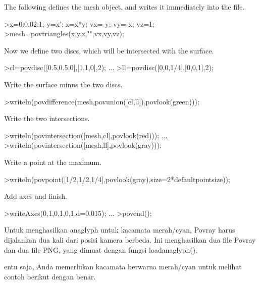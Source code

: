 \documentclass[a4paper,10pt]{article}
\begin{document}
\begin{eulernotebook}
\begin{eulercomment}
The following defines the mesh object, and writes it immediately into the file.
\end{eulercomment}
\begin{eulerprompt}
>x=0:0.02:1; y=x'; z=x*y; vx=-y; vy=-x; vz=1;
>mesh=povtriangles(x,y,z,"",vx,vy,vz);
\end{eulerprompt}
\begin{eulercomment}
Now we define two discs, which will be intersected with the surface.
\end{eulercomment}
\begin{eulerprompt}
>cl=povdisc([0.5,0.5,0],[1,1,0],2); ...
>ll=povdisc([0,0,1/4],[0,0,1],2);
\end{eulerprompt}
\begin{eulercomment}
Write the surface minus the two discs.
\end{eulercomment}
\begin{eulerprompt}
>writeln(povdifference(mesh,povunion([cl,ll]),povlook(green)));
\end{eulerprompt}
\begin{eulercomment}
Write the two intersections.
\end{eulercomment}
\begin{eulerprompt}
>writeln(povintersection([mesh,cl],povlook(red))); ...
>writeln(povintersection([mesh,ll],povlook(gray)));
\end{eulerprompt}
\begin{eulercomment}
Write a point at the maximum.
\end{eulercomment}
\begin{eulerprompt}
>writeln(povpoint([1/2,1/2,1/4],povlook(gray),size=2*defaultpointsize));
\end{eulerprompt}
\begin{eulercomment}
Add axes and finish.
\end{eulercomment}
\begin{eulerprompt}
>writeAxes(0,1,0,1,0,1,d=0.015); ...
>povend();
\end{eulerprompt}
\begin{eulercomment}
Untuk menghasilkan anaglyph untuk kacamata merah/cyan, Povray harus
dijalankan dua kali dari posisi kamera berbeda. Ini menghasilkan dua
file Povray dan dua file PNG, yang dimuat dengan fungsi
loadanaglyph().

entu saja, Anda memerlukan kacamata berwarna merah/cyan untuk melihat
contoh berikut dengan benar.


\end{eulercomment}
\end{eulernotebook}
\end{document}
